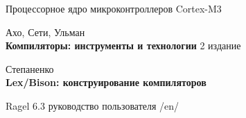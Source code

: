 \begin{thebibliography}{99}

 Процессорное ядро микроконтроллеров Cortex-M3


 Ахо, Сети, Ульман\\
\textbf{Компиляторы: инструменты и технологии} 2 издание

Степаненко\\
\textbf{Lex/Bison: конструирование компиляторов}

Ragel 6.3 руководство пользователя /en/

\end{thebibliography}

\secup
